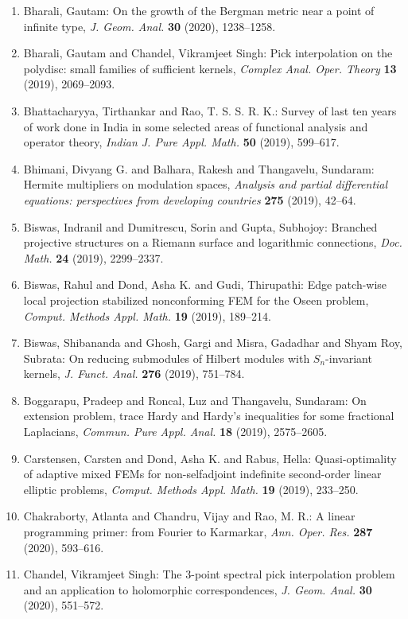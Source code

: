 \begin{enumerate}
\item Bharali, Gautam: On the growth of the {B}ergman metric near a point of infinite
type, \emph{J. Geom. Anal.} {\bf 30} (2020), 1238--1258.
\item Bharali, Gautam and Chandel, Vikramjeet Singh: Pick interpolation on the polydisc: small families of
sufficient kernels, \emph{Complex Anal. Oper. Theory} {\bf 13} (2019), 2069--2093.
\item Bhattacharyya, Tirthankar and Rao, T. S. S. R. K.: Survey of last ten years of work done in {I}ndia in some
selected areas of functional analysis and operator theory, \emph{Indian J. Pure Appl. Math.} {\bf 50} (2019), 599--617.
\item Bhimani, Divyang G. and Balhara, Rakesh and Thangavelu,
Sundaram: Hermite multipliers on modulation spaces, \emph{Analysis and partial differential equations: perspectives from
developing countries} {\bf 275} (2019), 42--64.
\item Biswas, Indranil and Dumitrescu, Sorin and Gupta, Subhojoy: Branched projective structures on a {R}iemann surface and
logarithmic connections, \emph{Doc. Math.} {\bf 24} (2019), 2299--2337.
\item Biswas, Rahul and Dond, Asha K. and Gudi, Thirupathi: Edge patch-wise local projection stabilized nonconforming
{FEM} for the {O}seen problem, \emph{Comput. Methods Appl. Math.} {\bf 19} (2019), 189--214.
\item Biswas, Shibananda and Ghosh, Gargi and Misra, Gadadhar and
Shyam Roy, Subrata: On reducing submodules of {H}ilbert modules with
{${S}_n$}-invariant kernels, \emph{J. Funct. Anal.} {\bf 276} (2019), 751--784.
\item Boggarapu, Pradeep and Roncal, Luz and Thangavelu, Sundaram: On extension problem, trace {H}ardy and {H}ardy's inequalities
for some fractional {L}aplacians, \emph{Commun. Pure Appl. Anal.} {\bf 18} (2019), 2575--2605.
\item Carstensen, Carsten and Dond, Asha K. and Rabus, Hella: Quasi-optimality of adaptive mixed {FEM}s for non-selfadjoint
indefinite second-order linear elliptic problems, \emph{Comput. Methods Appl. Math.} {\bf 19} (2019), 233--250.
\item Chakraborty, Atlanta and Chandru, Vijay and Rao, M. R.: A linear programming primer: from {F}ourier to {K}armarkar, \emph{Ann. Oper. Res.} {\bf 287} (2020), 593--616.
\item Chandel, Vikramjeet Singh: The 3-point spectral pick interpolation problem and an
application to holomorphic correspondences, \emph{J. Geom. Anal.} {\bf 30} (2020), 551--572.

\end{enumerate}
